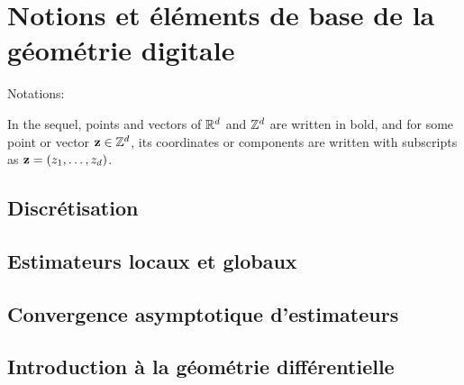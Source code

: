 %
\chapter{Notions et éléments de base de la géométrie digitale}
\label{sec:notions}


\setcounter{minitocdepth}{3}
\minitoc

\newpage
%
Notations:

In the sequel, points and vectors of $\mathbb{R}^d$ and $\mathbb{Z}^d$ are written in
bold, and for some point or vector $\mathbf{z} \in \mathbb{Z}^d$, its coordinates or
components are written with subscripts as $\mathbf{z}=(z_1,\ldots,z_d)$.
%
\section{Discrétisation}
%
\section{Estimateurs locaux et globaux}
%
\section{Convergence asymptotique d'estimateurs}
%
\section{Introduction à la géométrie différentielle}
%
